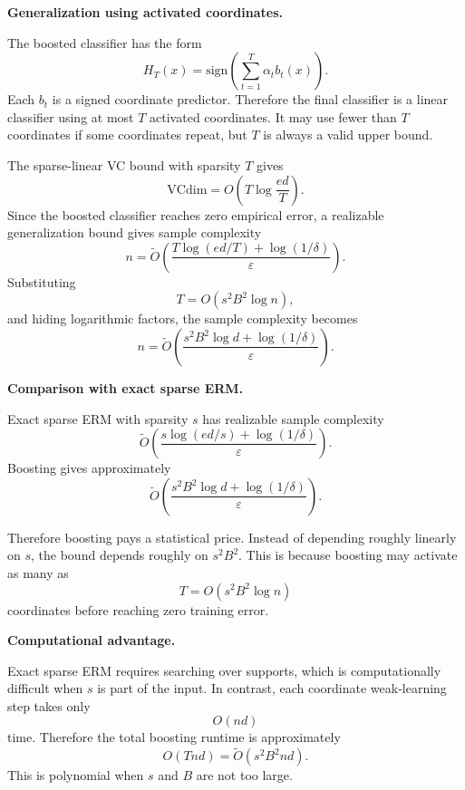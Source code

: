 \documentclass[11pt]{article}
\newcommand{\sign}{\mathrm{sign}}
\newcommand{\eps}{\varepsilon}
\newcommand{\VCdim}{\mathrm{VCdim}}
\begin{document}
\begin{enumerate}
\begin{solutionbox}
    \medskip

    \textbf{Generalization using activated coordinates.}

    The boosted classifier has the form
    \[
    H_T(x)
    =
    \sign\left(\sum_{t=1}^T\alpha_t b_t(x)\right).
    \]
    Each $b_t$ is a signed coordinate predictor. Therefore the final classifier is a linear
    classifier using at most $T$ activated coordinates. It may use fewer than $T$ coordinates if
    some coordinates repeat, but $T$ is always a valid upper bound.

    The sparse-linear VC bound with sparsity $T$ gives
    \[
    \VCdim
    =
    O\left(T\log\frac{ed}{T}\right).
    \]
    Since the boosted classifier reaches zero empirical error, a realizable generalization bound
    gives sample complexity
    \[
    n
    =
    \widetilde O\left(
    \frac{
    T\log(ed/T)+\log(1/\delta)
    }{\eps}
    \right).
    \]
    Substituting
    \[
    T=O(s^2B^2\log n),
    \]
    and hiding logarithmic factors, the sample complexity becomes
    \[
    \boxed{
    n
    =
    \widetilde O\left(
    \frac{
    s^2B^2\log d+\log(1/\delta)
    }{\eps}
    \right).
    }
    \]

    \medskip

    \textbf{Comparison with exact sparse ERM.}

    Exact sparse ERM with sparsity $s$ has realizable sample complexity
    \[
    \widetilde O\left(
    \frac{
    s\log(ed/s)+\log(1/\delta)
    }{\eps}
    \right).
    \]
    Boosting gives approximately
    \[
    \widetilde O\left(
    \frac{
    s^2B^2\log d+\log(1/\delta)
    }{\eps}
    \right).
    \]

    Therefore boosting pays a statistical price. Instead of depending roughly linearly on $s$, the
    bound depends roughly on $s^2B^2$. This is because boosting may activate as many as
    \[
    T=O(s^2B^2\log n)
    \]
    coordinates before reaching zero training error.

    \medskip

    \textbf{Computational advantage.}

    Exact sparse ERM requires searching over supports, which is computationally difficult when
    $s$ is part of the input. In contrast, each coordinate weak-learning step takes only
    \[
    O(nd)
    \]
    time. Therefore the total boosting runtime is approximately
    \[
    O(Tnd)
    =
    \widetilde O(s^2B^2nd).
    \]
    This is polynomial when $s$ and $B$ are not too large.


\end{solutionbox}
\end{enumerate}
\end{document}
